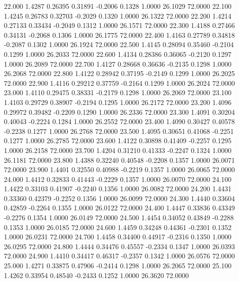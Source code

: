   22.000   1.4287   0.26395   0.31891  -0.2006   0.1328   1.0000  26.1029  72.0000
  22.100   1.4245   0.26783   0.32703  -0.2029   0.1320   1.0000  26.1322  72.0000
  22.200   1.4214   0.27133   0.33434  -0.2049   0.1312   1.0000  26.1571  72.0000
  22.300   1.4188   0.27466   0.34131  -0.2068   0.1306   1.0000  26.1775  72.0000
  22.400   1.4163   0.27789   0.34818  -0.2087   0.1302   1.0000  26.1924  72.0000
  22.500   1.4145   0.28094   0.35460  -0.2104   0.1299   1.0000  26.2033  72.0000
  22.600   1.4134   0.28386   0.36065  -0.2120   0.1297   1.0000  26.2089  72.0000
  22.700   1.4127   0.28668   0.36636  -0.2135   0.1298   1.0000  26.2068  72.0000
  22.800   1.4122   0.28942   0.37195  -0.2149   0.1299   1.0000  26.2025  72.0000
  22.900   1.4116   0.29212   0.37759  -0.2164   0.1299   1.0000  26.2024  72.0000
  23.000   1.4110   0.29475   0.38331  -0.2179   0.1298   1.0000  26.2069  72.0000
  23.100   1.4103   0.29729   0.38907  -0.2194   0.1295   1.0000  26.2172  72.0000
  23.200   1.4096   0.29972   0.39482  -0.2209   0.1290   1.0000  26.2336  72.0000
  23.300   1.4091   0.30204   0.40043  -0.2224   0.1284   1.0000  26.2552  72.0000
  23.400   1.4090   0.30427   0.40578  -0.2238   0.1277   1.0000  26.2768  72.0000
  23.500   1.4095   0.30651   0.41068  -0.2251   0.1277   1.0000  26.2785  72.0000
  23.600   1.4122   0.30898   0.41409  -0.2257   0.1295   1.0000  26.2158  72.0000
  23.700   1.4204   0.31210   0.41333  -0.2247   0.1324   1.0000  26.1181  72.0000
  23.800   1.4388   0.32240   0.40548  -0.2208   0.1357   1.0000  26.0071  72.0000
  23.900   1.4401   0.32550   0.40988  -0.2219   0.1357   1.0000  26.0065  72.0000
  24.000   1.4412   0.32833   0.41443  -0.2229   0.1357   1.0000  26.0070  72.0000
  24.100   1.4422   0.33103   0.41907  -0.2240   0.1356   1.0000  26.0082  72.0000
  24.200   1.4431   0.33360   0.42379  -0.2252   0.1356   1.0000  26.0099  72.0000
  24.300   1.4440   0.33604   0.42859  -0.2264   0.1355   1.0000  26.0122  72.0000
  24.400   1.4447   0.33836   0.43349  -0.2276   0.1354   1.0000  26.0149  72.0000
  24.500   1.4454   0.34052   0.43849  -0.2288   0.1353   1.0000  26.0185  72.0000
  24.600   1.4459   0.34248   0.44361  -0.2301   0.1352   1.0000  26.0231  72.0000
  24.700   1.4458   0.34400   0.44917  -0.2316   0.1350   1.0000  26.0295  72.0000
  24.800   1.4444   0.34476   0.45557  -0.2334   0.1347   1.0000  26.0393  72.0000
  24.900   1.4410   0.34417   0.46317  -0.2357   0.1342   1.0000  26.0576  72.0000
  25.000   1.4271   0.33875   0.47906  -0.2414   0.1298   1.0000  26.2065  72.0000
  25.100   1.4262   0.33954   0.48540  -0.2433   0.1252   1.0000  26.3620  72.0000
